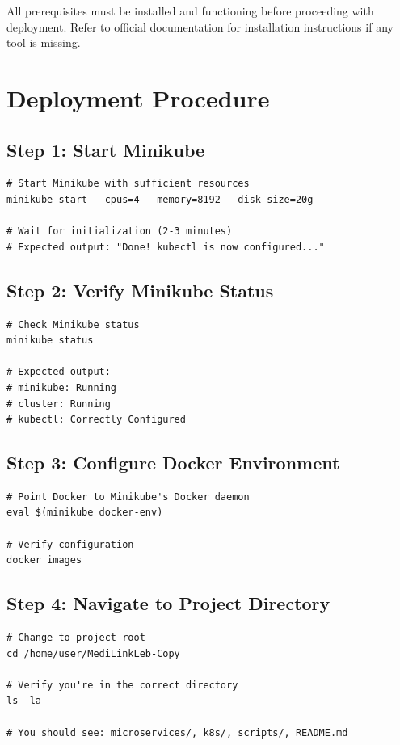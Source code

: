 \documentclass[12pt,a4paper]{article}
\begin{document}
\begin{importantbox}
All prerequisites must be installed and functioning before proceeding with deployment. Refer to official documentation for installation instructions if any tool is missing.
\end{importantbox}

\section{Deployment Procedure}

\subsection{Step 1: Start Minikube}
\begin{lstlisting}[style=bash]
# Start Minikube with sufficient resources
minikube start --cpus=4 --memory=8192 --disk-size=20g

# Wait for initialization (2-3 minutes)
# Expected output: "Done! kubectl is now configured..."
\end{lstlisting}

\subsection{Step 2: Verify Minikube Status}
\begin{lstlisting}[style=bash]
# Check Minikube status
minikube status

# Expected output:
# minikube: Running
# cluster: Running
# kubectl: Correctly Configured
\end{lstlisting}

\subsection{Step 3: Configure Docker Environment}
\begin{lstlisting}[style=bash]
# Point Docker to Minikube's Docker daemon
eval $(minikube docker-env)

# Verify configuration
docker images
\end{lstlisting}

\subsection{Step 4: Navigate to Project Directory}
\begin{lstlisting}[style=bash]
# Change to project root
cd /home/user/MediLinkLeb-Copy

# Verify you're in the correct directory
ls -la

# You should see: microservices/, k8s/, scripts/, README.md
\end{lstlisting}
\end{document}
